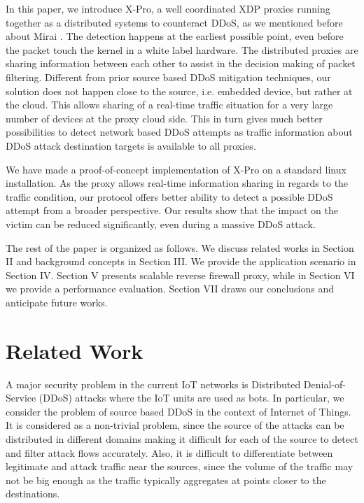 \documentclass[sigplan,screen]{acmart}
\begin{document}
In this paper, we introduce X-Pro, a well coordinated XDP proxies running together as a distributed systems to counteract DDoS, as we mentioned before about Mirai \cite{203628}. The detection happens at the earliest possible point, even before the packet touch the kernel in a white label hardware. The distributed proxies are sharing information between each other to assist in the decision making of packet filtering.  Different from prior source based DDoS mitigation techniques, our solution does not happen close to the source, i.e. embedded device, but rather at the cloud. This allows sharing of a real-time traffic situation for a very large number of devices at the proxy cloud side. This in turn gives much better possibilities to detect network based DDoS attempts as traffic information about DDoS attack destination targets is available to all proxies.

We have made a proof-of-concept implementation of X-Pro on a standard linux installation. As the proxy allows real-time information sharing in regards to the traffic condition, our protocol offers better ability to detect a possible DDoS attempt from a broader perspective. Our results show that the impact on the victim can be reduced significantly, even during a massive DDoS attack.

The rest of the paper is organized as follows. We discuss related works in Section II and background concepts in Section III. We provide the application scenario in Section IV. Section V presents scalable reverse firewall proxy, while in Section VI we provide a performance evaluation. Section VII draws our conclusions and anticipate future works.

\section{Related Work}
A major security problem in the current IoT networks is Distributed Denial-of-Service (DDoS) attacks where the IoT units are used as bots. In particular, we consider the problem of source based DDoS in the context of Internet of Things. It is considered as a non-trivial problem, since the source of the attacks can be distributed in different domains making it difficult for each of the source to detect and filter attack flows accurately. Also, it is difficult to differentiate between legitimate and attack traffic near the sources, since the volume of the traffic may not be big enough as the traffic typically aggregates at points closer to the destinations.
\end{document}

